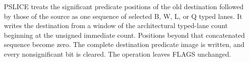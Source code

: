 PSLICE treats the significant predicate positions of the old destination followed by those of the source as one sequence of selected B, W, L, or Q typed lanes.
It writes the destination from a window of the architectural typed-lane count beginning at the unsigned immediate count.
Positions beyond that concatenated sequence become zero.
The complete destination predicate image is written, and every nonsignificant bit is cleared.
The operation leaves FLAGS unchanged.
